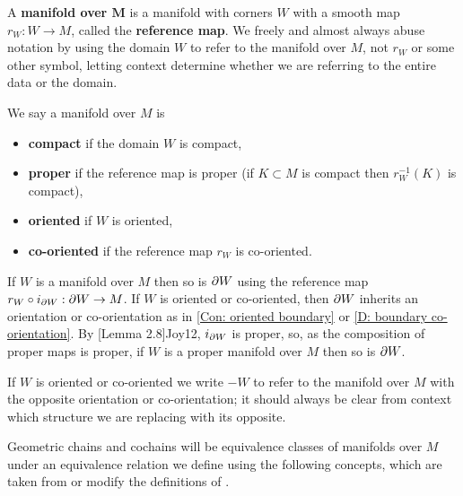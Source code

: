 \begin{definition} \label{V: maps are co-oriented}
A \textbf{manifold over $\mathbf{M}$}  is a manifold with corners $W$ with a smooth map $r_W : W \to M$,
called the \textbf{reference map}. We freely and almost always abuse notation
by using the domain $W$ to refer to the manifold over $M$, not  $r_W$ or some other symbol, letting
context determine whether we are referring to the entire data or the domain.

We say a manifold over $M$ is
\begin{itemize}
\item \textbf{compact} if the domain $W$ is compact,
\item \textbf{proper} if the reference map is proper (if $K\subset M$ is compact then $r_W^{-1}(K)$ is compact),
\item \textbf{oriented} if $W$ is oriented,
\item \textbf{co-oriented} if the reference map $r_W$ is co-oriented.
\end{itemize}
If $W$ is a manifold over $M$ then so is $\partial W$  using the reference map $r_W\circ i_{\partial W}:\partial W\to M$.
If $W$ is oriented or co-oriented, then $\partial W$ inherits an orientation or co-orientation as in \cref{Con: oriented boundary}  or \cref{D: boundary co-orientation}. By [Lemma 2.8]{Joy12}, $i_{\partial W}$ is proper, so, as the composition of proper maps is proper, if $W$ is a proper manifold over $M$ then so is $\partial W$.

If $W$ is oriented or co-oriented we write $-W$ to refer to the manifold over $M$ with the opposite orientation or co-orientation; it should always be clear from context which structure we are replacing with its opposite.
\end{definition}




Geometric chains and cochains will be equivalence classes of manifolds over $M$ under an equivalence relation we define using the following concepts, which are taken from or modify
the definitions of \cite{Lipy14}.





